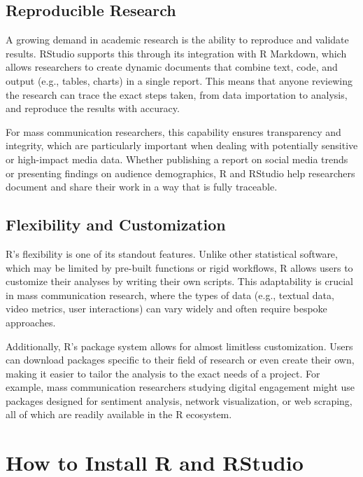 \documentclass[
]{book}
\begin{document}
\subsection*{Reproducible Research}\label{reproducible-research}

A growing demand in academic research is the ability to reproduce and validate results. RStudio supports this through its integration with R Markdown, which allows researchers to create dynamic documents that combine text, code, and output (e.g., tables, charts) in a single report. This means that anyone reviewing the research can trace the exact steps taken, from data importation to analysis, and reproduce the results with accuracy.

For mass communication researchers, this capability ensures transparency and integrity, which are particularly important when dealing with potentially sensitive or high-impact media data. Whether publishing a report on social media trends or presenting findings on audience demographics, R and RStudio help researchers document and share their work in a way that is fully traceable.

\subsection*{Flexibility and Customization}\label{flexibility-and-customization}

R's flexibility is one of its standout features. Unlike other statistical software, which may be limited by pre-built functions or rigid workflows, R allows users to customize their analyses by writing their own scripts. This adaptability is crucial in mass communication research, where the types of data (e.g., textual data, video metrics, user interactions) can vary widely and often require bespoke approaches.

Additionally, R's package system allows for almost limitless customization. Users can download packages specific to their field of research or even create their own, making it easier to tailor the analysis to the exact needs of a project. For example, mass communication researchers studying digital engagement might use packages designed for sentiment analysis, network visualization, or web scraping, all of which are readily available in the R ecosystem.

\section{How to Install R and RStudio}\label{how-to-install-r-and-rstudio}
\end{document}
